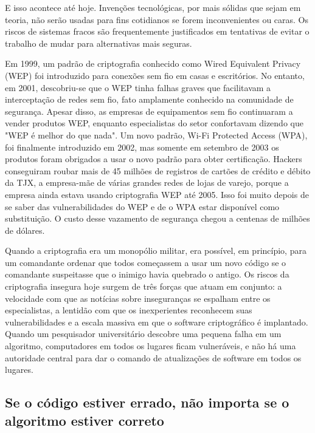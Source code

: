 \documentclass{book}
\begin{document}
E isso acontece até hoje. Invenções tecnológicas, por mais sólidas que sejam em teoria, não serão usadas para fins cotidianos se forem inconvenientes ou caras. Os riscos de sistemas fracos são frequentemente justificados em tentativas de evitar o trabalho de mudar para alternativas mais seguras.

Em 1999, um padrão de criptografia conhecido como Wired Equivalent Privacy (WEP) foi introduzido para conexões sem fio em casas e escritórios. No entanto, em 2001, descobriu-se que o WEP tinha falhas graves que facilitavam a interceptação de redes sem fio, fato amplamente conhecido na comunidade de segurança. Apesar disso, as empresas de equipamentos sem fio continuaram a vender produtos WEP, enquanto especialistas do setor confortavam dizendo que "WEP é melhor do que nada". Um novo padrão, Wi-Fi Protected Access (WPA), foi finalmente introduzido em 2002, mas somente em setembro de 2003 os produtos foram obrigados a usar o novo padrão para obter certificação. Hackers conseguiram roubar mais de 45 milhões de registros de cartões de crédito e débito da TJX, a empresa-mãe de várias grandes redes de lojas de varejo, porque a empresa ainda estava usando criptografia WEP até 2005. Isso foi muito depois de se saber das vulnerabilidades do WEP e de o WPA estar disponível como substituição. O custo desse vazamento de segurança chegou a centenas de milhões de dólares.

Quando a criptografia era um monopólio militar, era possível, em princípio, para um comandante ordenar que todos começassem a usar um novo código se o comandante suspeitasse que o inimigo havia quebrado o antigo. Os riscos da criptografia insegura hoje surgem de três forças que atuam em conjunto: a velocidade com que as notícias sobre inseguranças se espalham entre os especialistas, a lentidão com que os inexperientes reconhecem suas vulnerabilidades e a escala massiva em que o software criptográfico é implantado. Quando um pesquisador universitário descobre uma pequena falha em um algoritmo, computadores em todos os lugares ficam vulneráveis, e não há uma autoridade central para dar o comando de atualizações de software em todos os lugares.


\subsection{Se o código estiver errado, não importa se o algoritmo estiver correto}
\label{segredos:errado}
\end{document}
